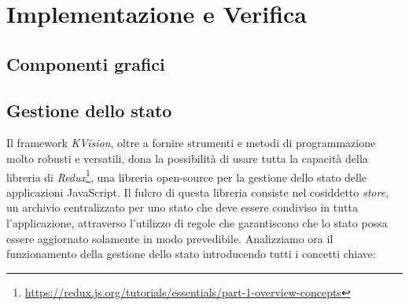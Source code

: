 \chapter{Implementazione e Verifica}

\section{Componenti grafici}

\section{Gestione dello stato}
Il framework \textit{KVision}, oltre a fornire strumenti e metodi di programmazione molto robusti e versatili, dona la possibilità di usare tutta la capacità della libreria di \textit{Redux}\footnote{\url{https://redux.js.org/tutorials/essentials/part-1-overview-concepts}}, una libreria open-source per la gestione dello stato delle applicazioni JavaScript. Il fulcro di questa libreria consiste nel cosiddetto \textit{store}, un archivio centralizzato per uno stato che deve essere condiviso in tutta l'applicazione, attraverso l'utilizzo di regole che garantiscono che lo stato possa essere aggiornato solamente in modo prevedibile. Analizziamo ora il funzionamento della gestione dello stato introducendo tutti i concetti chiave: 
